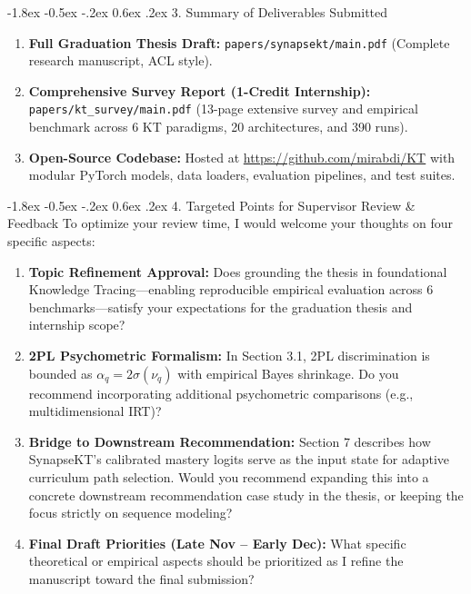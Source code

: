 \documentclass[10.5pt,a4paper]{article}
\makeatletter
\renewcommand{\section}{\@startsection{section}{1}{\z@}%
  {-1.8ex \@plus -0.5ex \@minus -.2ex}%
  {0.6ex \@plus .2ex}%
  {\normalfont\large\bfseries\color{blue!80!black}}}
\makeatother
\begin{document}
\section{3. Summary of Deliverables Submitted}
\begin{enumerate}\setlength{\itemsep}{1.5pt}\setlength{\parskip}{0pt}\setlength{\topsep}{0pt}\setlength{\partopsep}{0pt}
    \item \textbf{Full Graduation Thesis Draft:} \texttt{papers/synapsekt/main.pdf} (Complete research manuscript, ACL style).
    \item \textbf{Comprehensive Survey Report (1-Credit Internship):} \texttt{papers/kt\_survey/main.pdf} (13-page extensive survey and empirical benchmark across 6 KT paradigms, 20 architectures, and 390 runs).
    \item \textbf{Open-Source Codebase:} Hosted at \url{https://github.com/mirabdi/KT} with modular PyTorch models, data loaders, evaluation pipelines, and test suites.
\end{enumerate}

\section{4. Targeted Points for Supervisor Review \& Feedback}
To optimize your review time, I would welcome your thoughts on four specific aspects:
\begin{enumerate}\setlength{\itemsep}{2pt}\setlength{\parskip}{0pt}\setlength{\topsep}{0pt}\setlength{\partopsep}{0pt}
    \item \textbf{Topic Refinement Approval:} Does grounding the thesis in foundational Knowledge Tracing—enabling reproducible empirical evaluation across 6 benchmarks—satisfy your expectations for the graduation thesis and internship scope?
    \item \textbf{2PL Psychometric Formalism:} In Section 3.1, 2PL discrimination is bounded as $\alpha_q = 2\sigma(\nu_q)$ with empirical Bayes shrinkage. Do you recommend incorporating additional psychometric comparisons (e.g., multidimensional IRT)?
    \item \textbf{Bridge to Downstream Recommendation:} Section 7 describes how SynapseKT's calibrated mastery logits serve as the input state for adaptive curriculum path selection. Would you recommend expanding this into a concrete downstream recommendation case study in the thesis, or keeping the focus strictly on sequence modeling?
    \item \textbf{Final Draft Priorities (Late Nov -- Early Dec):} What specific theoretical or empirical aspects should be prioritized as I refine the manuscript toward the final submission?
\end{enumerate}
\end{document}
